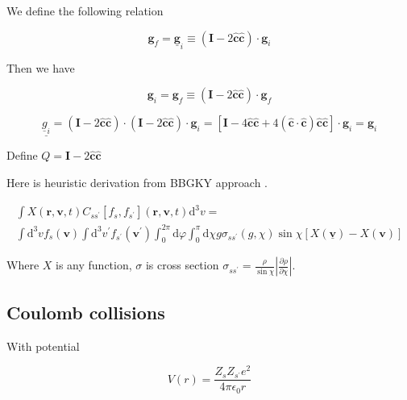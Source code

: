 We define the following relation

\begin{equation}
\mathbf{g}_{f}=\underline{\mathbf{g}}_{i} \equiv(\mathbf{I}-2 \hat{\mathbf{c}} \hat{\mathbf{c}}) \cdot \mathbf{g}_{i}
\end{equation}

Then we have

\begin{equation}
\mathbf{g}_{i}=\mathbf{g}_{f} \equiv(\mathbf{I}-2 \hat{\mathbf{c}} \hat{\mathbf{c}}) \cdot \mathbf{g}_{f}
\end{equation}

\begin{equation}
\underline{\underline{g}_{i}}=(\mathbf{I}-2 \hat{\mathbf{c}} \hat{\mathbf{c}}) \cdot(\mathbf{I}-2 \hat{\mathbf{c}} \hat{\mathbf{c}}) \cdot \mathbf{g}_{i}=[\mathbf{I}-4 \hat{\mathbf{c}} \hat{\mathbf{c}}+4(\hat{\mathbf{c}} \cdot \hat{\mathbf{c}}) \hat{\mathbf{c}} \hat{\mathbf{c}}] \cdot \mathbf{g}_{i}=\mathbf{g}_{i}
\end{equation}

Define $Q=\mathbf{I}-2 \hat{\mathbf{c}} \hat{\mathbf{c}}$

Here is heuristic derivation from BBGKY approach \cite{coll2}. 

\begin{equation}
\begin{array}{l}{\int X(\mathbf{r}, \mathbf{v}, t) C_{s s^{\prime}}\left[f_{s}, f_{s^{\prime}}\right](\mathbf{r}, \mathbf{v}, t) \mathrm{d}^{3} v=} \\ {\int \mathrm{d}^{3} v f_{s}(\mathbf{v}) \int \mathrm{d}^{3} v^{\prime} f_{s^{\prime}}\left(\mathbf{v}^{\prime}\right) \int_{0}^{2 \pi} \mathrm{d} \varphi \int_{0}^{\pi} \mathrm{d} \chi g \sigma_{s s^{\prime}}(g, \chi) \sin \chi[X(\underline{\mathbf{v}})-X(\mathbf{v})]}\end{array}
\end{equation}

Where $X$ is any function, $\sigma$ is cross section $\sigma_{s s^{\prime}}=\frac{\rho}{\sin \chi}\left|\frac{\partial \rho}{\partial \chi}\right|$.

\subsection{Coulomb collisions}

With potential 

\begin{equation}
V(r)=\frac{Z_{s} Z_{s^{\prime}} e^{2}}{4 \pi \epsilon_{0} r}
\end{equation}

